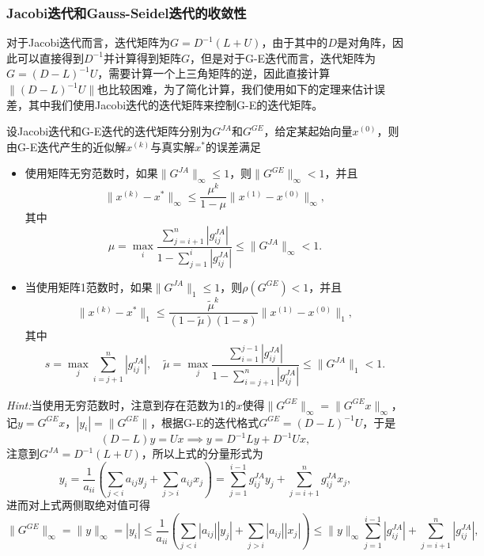 \documentclass[a4paper,10pt]{ctexart}
\begin{document}
\subsubsection{Jacobi迭代和Gauss-Seidel迭代的收敛性}
对于Jacobi迭代而言，迭代矩阵为$ G= D^{-1}(L+U) $，由于其中的$ D $是对角阵，因此可以直接得到$ D^{-1} $并计算得到矩阵$ G $，但是对于G-E迭代而言，迭代矩阵为$ G = (D-L)^{-1}U $，需要计算一个上三角矩阵的逆，因此直接计算$ \| (D-L)^{-1}U \| $也比较困难，为了简化计算，我们使用如下的定理来估计误差，其中我们使用Jacobi迭代的迭代矩阵来控制G-E的迭代矩阵。
\begin{theorem}
    设Jacobi迭代和G-E迭代的迭代矩阵分别为$ G^{JA} $和$ G^{GE} $，给定某起始向量$ x^{(0)} $，则由G-E迭代产生的近似解$ x^{(k)} $与真实解$ x^* $的误差满足
    \begin{itemize}
        \item 使用矩阵无穷范数时，如果$ \| G^{JA} \|_\infty \leqslant 1 $，则$ \| G^{GE} \|_\infty <1 $，并且
        \begin{equation}
            \| x^{(k)} - x^* \|_\infty \leqslant \frac{\mu^k}{1-\mu} \| x^{(1)} - x^{(0)} \|_\infty,
        \end{equation}
        其中
        \[
            \mu = \max_i \frac{\sum_{j=i+1}^n |g^{JA}_{ij}|}{1-\sum_{j=1}^i |g^{JA}_{ij}|} \leqslant \| G^{JA} \|_\infty<1.
        \]
        \item 当使用矩阵1范数时，如果$ \| G^{JA} \|_1 \leqslant 1 $，则$ \rho(G^{GE}) <1 $，并且
        \begin{equation}
            \| x^{(k)} - x^* \|_1 \leqslant \frac{\tilde{\mu}^k}{(1-\tilde{\mu})(1-s)} \| x^{(1)} - x^{(0)} \|_1,
        \end{equation}
        其中
        \[
            s = \max_j \sum_{i=j+1}^n |g^{JA}_{ij}|,\quad \tilde{\mu} = \max_j \frac{\sum_{i=1}^{j-1} |g^{JA}_{ij}|}{1-\sum_{i=j+1}^n |g^{JA}_{ij}|} \leqslant \| G^{JA} \|_1<1.
        \]
    \end{itemize}
\end{theorem}
\noindent \emph{Hint:}当使用无穷范数时，注意到存在范数为1的$ x $使得$ \| G^{GE} \|_\infty = \| G^{GE}x \|_\infty $，记$ y = G^{GE}x $，$ |y_i| = \| G^{GE} \| $，根据G-E的迭代格式$ G^{GE} = (D-L)^{-1}U $，于是
\[
    (D-L)y = Ux\implies y = D^{-1}L y + D^{-1}U x,
\]
注意到$ G^{JA} = D^{-1}(L+U) $，所以上式的分量形式为
\[
    y_i = \frac{1}{a_{ii}} \left( \sum_{j<i} a_{ij}y_j + \sum_{j>i} a_{ij}x_j \right) = \sum_{j= 1}^{i-1} g^{JA}_{ij}y_j + \sum_{j=i+1}^n g^{JA}_{ij}x_j,
\]
进而对上式两侧取绝对值可得
\[
    \| G^{GE} \|_\infty = \| y \|_\infty = |y_i|\leqslant \frac{1}{a_{ii}} \left( \sum_{j<i} |a_{ij}||y_j| + \sum_{j>i} |a_{ij}||x_j| \right)  \leqslant \| y \|_\infty \sum_{j=1}^{i-1} |g^{JA}_{ij}| + \sum_{j=i+1}^n |g^{JA}_{ij}|,
\]
\end{document}
